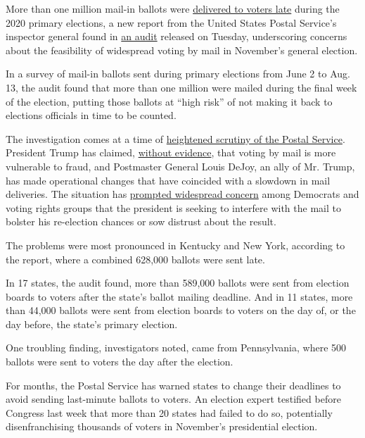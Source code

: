 More than one million mail-in ballots were
\href{https://www.nytimes3xbfgragh.onion/2020/09/01/us/politics/postal-service-late-ballots.html}{delivered
to voters late} during the 2020 primary elections, a new report from the
United States Postal Service's inspector general found in
\href{https://www.uspsoig.gov/sites/default/files/document-library-files/2020/20-225-R20.pdf}{an
audit} released on Tuesday, underscoring concerns about the feasibility
of widespread voting by mail in November's general election.

In a survey of mail-in ballots sent during primary elections from June 2
to Aug. 13, the audit found that more than one million were mailed
during the final week of the election, putting those ballots at ``high
risk'' of not making it back to elections officials in time to be
counted.

The investigation comes at a time of
\href{https://www.nytimes3xbfgragh.onion/2020/08/15/us/post-office-vote-by-mail.html}{heightened
scrutiny of the Postal Service}. President Trump has claimed,
\href{https://www.nytimes3xbfgragh.onion/2020/08/26/us/politics/mail-in-voting-foreign-intervention.html}{without
evidence}, that voting by mail is more vulnerable to fraud, and
Postmaster General Louis DeJoy, an ally of Mr. Trump, has made
operational changes that have coincided with a slowdown in mail
deliveries. The situation has
\href{https://www.nytimes3xbfgragh.onion/2020/07/31/us/politics/trump-usps-mail-delays.html}{prompted
widespread concern} among Democrats and voting rights groups that the
president is seeking to interfere with the mail to bolster his
re-election chances or sow distrust about the result.

The problems were most pronounced in Kentucky and New York, according to
the report, where a combined 628,000 ballots were sent late.

In 17 states, the audit found, more than 589,000 ballots were sent from
election boards to voters after the state's ballot mailing deadline. And
in 11 states, more than 44,000 ballots were sent from election boards to
voters on the day of, or the day before, the state's primary election.

One troubling finding, investigators noted, came from Pennsylvania,
where 500 ballots were sent to voters the day after the election.

For months, the Postal Service has warned states to change their
deadlines to avoid sending last-minute ballots to voters. An election
expert testified before Congress last week that more than 20 states had
failed to do so, potentially disenfranchising thousands of voters in
November's presidential election.

